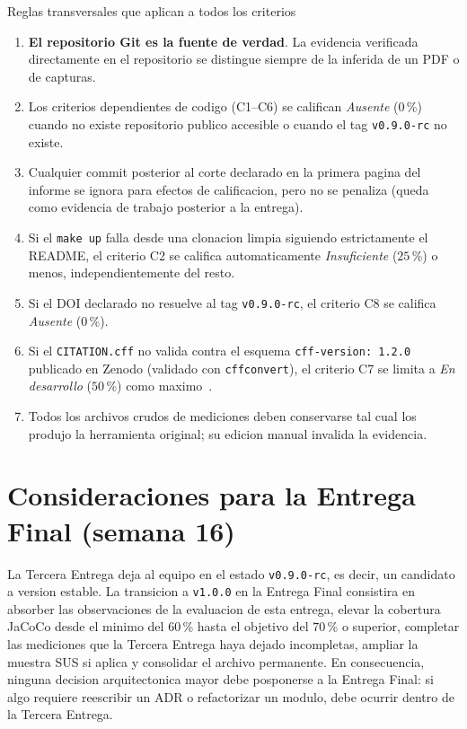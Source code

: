 \documentclass[11pt,a4paper]{article}
\begin{document}
\begin{cajacritica}{Reglas transversales que aplican a todos los criterios}
    \begin{enumerate}
        \item \textbf{El repositorio Git es la fuente de verdad}. La evidencia verificada directamente en el repositorio se distingue siempre de la inferida de un PDF o de capturas.
        \item Los criterios dependientes de codigo (C1--C6) se califican \emph{Ausente} ($0$\,\%) cuando no existe repositorio publico accesible o cuando el tag \texttt{v0.9.0-rc} no existe.
        \item Cualquier commit posterior al corte declarado en la primera pagina del informe se ignora para efectos de calificacion, pero no se penaliza (queda como evidencia de trabajo posterior a la entrega).
        \item Si el \texttt{make up} falla desde una clonacion limpia siguiendo estrictamente el README, el criterio C2 se califica automaticamente \emph{Insuficiente} ($25$\,\%) o menos, independientemente del resto.
        \item Si el DOI declarado no resuelve al tag \texttt{v0.9.0-rc}, el criterio C8 se califica \emph{Ausente} ($0$\,\%).
        \item Si el \texttt{CITATION.cff} no valida contra el esquema \texttt{cff-version: 1.2.0} publicado en Zenodo (validado con \texttt{cffconvert}), el criterio C7 se limita a \emph{En desarrollo} ($50$\,\%) como maximo~\cite{druskat2021cff}.
        \item Todos los archivos crudos de mediciones deben conservarse tal cual los produjo la herramienta original; su edicion manual invalida la evidencia.
    \end{enumerate}
\end{cajacritica}

\section{Consideraciones para la Entrega Final (semana 16)}

La Tercera Entrega deja al equipo en el estado \texttt{v0.9.0-rc}, es decir, un candidato a version estable. La transicion a \texttt{v1.0.0} en la Entrega Final consistira en absorber las observaciones de la evaluacion de esta entrega, elevar la cobertura JaCoCo desde el minimo del $60$\,\% hasta el objetivo del $70$\,\% o superior, completar las mediciones que la Tercera Entrega haya dejado incompletas, ampliar la muestra SUS si aplica y consolidar el archivo permanente. En consecuencia, ninguna decision arquitectonica mayor debe posponerse a la Entrega Final: si algo requiere reescribir un ADR o refactorizar un modulo, debe ocurrir dentro de la Tercera Entrega.



\end{document}
